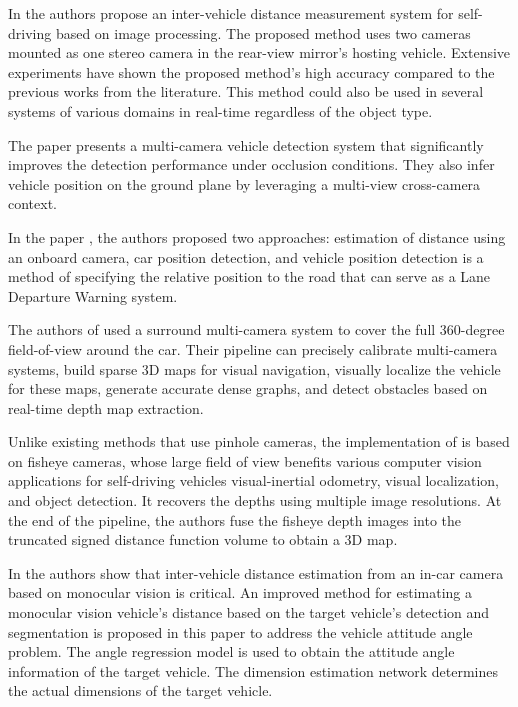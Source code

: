 In \cite{Zaarane2020} the authors propose an inter-vehicle distance measurement system for self-driving based on image processing. The proposed method uses two cameras mounted as one stereo camera in the rear-view mirror's hosting vehicle.  Extensive experiments have shown the proposed method's high accuracy compared to the previous works from the literature. This method could also be used in several systems of various domains in real-time regardless of the object type.

The paper \cite{Wu2019} presents a multi-camera vehicle detection system that significantly improves the detection performance under occlusion conditions. They also infer vehicle position on the ground plane by leveraging a multi-view cross-camera context.

In the paper \cite{ Ali2016}, the authors proposed two approaches: estimation of distance using an onboard camera, car position detection, and vehicle position detection is a method of specifying the relative position to the road that can serve as a Lane Departure Warning system. 

The authors of \cite{Hane2017} used a surround multi-camera system to cover the full 360-degree field-of-view around the car. Their pipeline can precisely calibrate multi-camera systems, build sparse 3D maps for visual navigation, visually localize the vehicle for these maps, generate accurate dense graphs, and detect obstacles based on real-time depth map extraction.

Unlike existing methods that use pinhole cameras, the implementation of \cite{Cui2019} is based on fisheye cameras, whose large field of view benefits various computer vision applications for self-driving vehicles visual-inertial odometry, visual localization, and object detection. It recovers the depths using multiple image resolutions. At the end of the pipeline, the authors fuse the fisheye depth images into the truncated signed distance function volume to obtain a 3D map.

In \cite{Huang2019} the authors show that inter-vehicle distance estimation from an in-car camera based on monocular vision is critical.  An improved method for estimating a monocular vision vehicle's distance based on the target vehicle's detection and segmentation is proposed in this paper to address the vehicle attitude angle problem. The angle regression model is used to obtain the attitude angle information of the target vehicle. The dimension estimation network determines the actual dimensions of the target vehicle.

